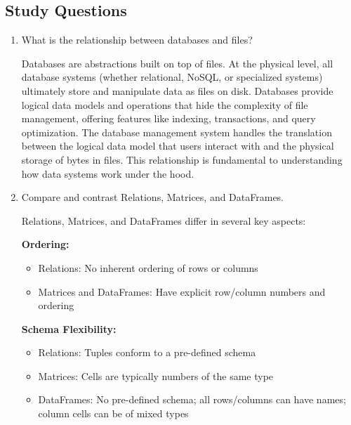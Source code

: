 \documentclass[12pt]{article}
\begin{document}
\subsection{Study Questions}

\begin{enumerate}
    \item What is the relationship between databases and files?
    
    \begin{tcolorbox}[colback=blue!5!white,colframe=blue!75!black,title={Solution}]
    Databases are abstractions built on top of files. At the physical level, all database systems (whether relational, NoSQL, or specialized systems) ultimately store and manipulate data as files on disk. Databases provide logical data models and operations that hide the complexity of file management, offering features like indexing, transactions, and query optimization. The database management system handles the translation between the logical data model that users interact with and the physical storage of bytes in files. This relationship is fundamental to understanding how data systems work under the hood.
    \end{tcolorbox}
    
    \item Compare and contrast Relations, Matrices, and DataFrames.
    
    \begin{tcolorbox}[colback=blue!5!white,colframe=blue!75!black,title={Solution}]
    Relations, Matrices, and DataFrames differ in several key aspects:
    
    \textbf{Ordering:}
    \begin{itemize}
        \item Relations: No inherent ordering of rows or columns
        \item Matrices and DataFrames: Have explicit row/column numbers and ordering
    \end{itemize}
    
    \textbf{Schema Flexibility:}
    \begin{itemize}
        \item Relations: Tuples conform to a pre-defined schema
        \item Matrices: Cells are typically numbers of the same type
        \item DataFrames: No pre-defined schema; all rows/columns can have names; column cells can be of mixed types
    \end{itemize}
    

\end{tcolorbox}
\end{enumerate}
\end{document}
